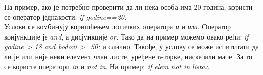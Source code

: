         На пример, ако је потребно проверити да ли нека особа има 20 година, користи се оператор једнакости: \emph{if godine==20:}\\
        
        Услови се комбинују коришћењем логичких оператора \emph{и} и \emph{или}. Оператор конјункције је \emph{and}, а дисјункције \emph{or}. Тако да на пример можемо овако рећи: \emph{if godine > 18 and bodovi >=50:} и слично.
        \pagebreak
        Такође, у услову се може испититати да ли је или није неки елемент члан листе, уређене n-торке, ниске или мапе.  За то се користе оператори \emph{in} и \emph{not in}. На пример: \emph{if elem not in lista:}.